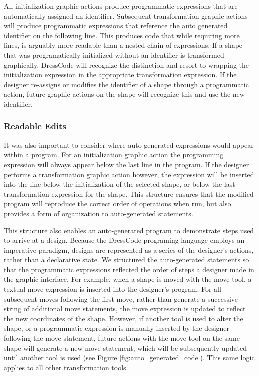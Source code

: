 \documentclass{sigchi}
\begin{document}
All initialization graphic actions produce programmatic expressions that are automatically assigned an identifier. Subsequent transformation graphic actions will produce programmatic expressions that reference the auto generated identifier on the following line. This produces code that while requiring more lines, is arguably more readable than a nested chain of expressions. If a shape that was programatically initialized without an identifier is transformed graphically, DressCode will recognize the distinction and resort to wrapping the initialization expression in the appropriate transformation expression. If the designer re-assigns or modifies the identifier of a shape through a programmatic action, future graphic actions on the shape will recognize this and use the new identifier.

\subsubsection{Readable Edits}
It was also important to consider where auto-generated expressions would appear within a program. For an initialization graphic action the programming expression will always appear below the last line in the program. If the designer performs a transformation graphic action however, the expression will be inserted into the line below the initialization of the selected shape, or below the last transformation expression for the shape. This structure ensures that the modified program will reproduce the correct order of operations when run, but also provides a form of organization to auto-generated statements. 

This structure also enables an auto-generated program to demonstrate steps used to arrive at a design. Because the DressCode programing language employs an imperative paradigm, designs are represented as a series of the designer's actions, rather than a declarative state. We structured the auto-generated statements so that the programmatic expressions reflected the order of steps a designer made in the graphic interface. For example, when a shape is moved with the move tool, a textual move expression is inserted into the designer's program. For all subsequent moves following the first move, rather than generate a successive string of additional move statements, the move expression is updated to reflect the new coordinates of the shape. However, if another tool is used to alter the shape, or a programmatic expression is manually inserted by the designer following the move statement, future actions with the move tool on the same shape will generate a new move statement, which will be subsequently updated until another tool is used (see Figure \ref{fig:auto_generated_code}). This same logic applies to all other transformation tools.
\end{document}
